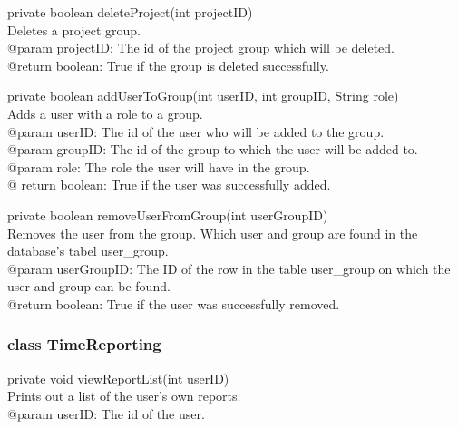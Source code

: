 \documentclass[a4paper]{article}
\begin{document}
\vspace{5mm}
\begin{hangparas}{1.5em}{1}
private boolean deleteProject(int projectID)\\
Deletes a project group.\\
@param projectID: The id of the project group which will be deleted.\\
@return boolean: True if the group is deleted successfully.
\end{hangparas}

\vspace{5mm}
\begin{hangparas}{1.5em}{1}
private boolean addUserToGroup(int userID, int groupID, String role)\\
Adds a user with a role to a group.\\
@param userID: The id of the user who will be added to the group.\\
@param groupID: The id of the group to which the user will be added to.\\
@param role: The role the user will have in the group.\\
@ return boolean: True if the user was successfully added.
\end{hangparas}

\vspace{5mm}
\begin{hangparas}{1.5em}{1}
private boolean removeUserFromGroup(int userGroupID)\\
Removes the user from the group. Which user and group are found in the database's tabel user\_group.\\
@param userGroupID: The ID of the row in the table user\_group on which the user and group can be found.\\
@return boolean: True if the user was successfully removed.\\
\end{hangparas}


\subsubsection{class TimeReporting}

\begin{hangparas}{1.5em}{1}
private void viewReportList(int userID)\\
Prints out a list of the user’s own reports. \\
@param userID: The id of the user.
\end{hangparas}
\end{document}
